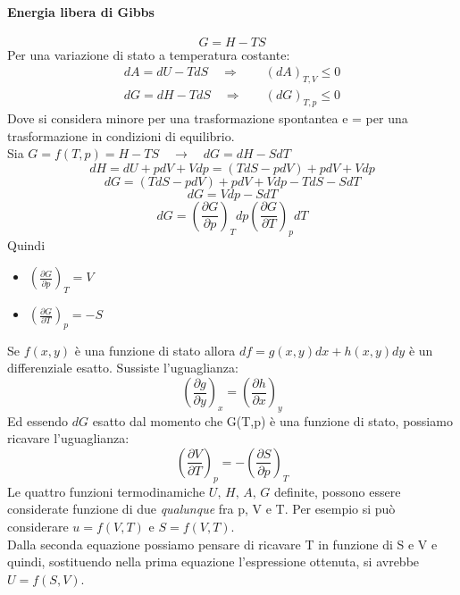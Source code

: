 \documentclass{article}
\newcommand{\so}{\quad \rightarrow \quad}
\newcommand{\So}{\quad \Rightarrow \quad}
\newcommand{\dpar}[3]{\left(\frac{\partial #1}{\partial #2}\right)_{#3}d#2}
\begin{document}
\paragraph{Energia libera di Gibbs}
\begin{equation*}
    G=H-TS
\end{equation*}
Per una variazione di stato a temperatura costante:
\begin{align*}
    dA=dU-TdS \So& (dA)_{T,V}\le0\\
    dG=dH-TdS \So& (dG)_{T,p}\le0
\end{align*}
Dove si considera minore per una trasformazione spontantea e = per una trasformazione in condizioni di equilibrio.\\
Sia $G=f(T,p)=H-TS \so dG=dH-SdT$
\begin{equation*}
    dH=dU+pdV+Vdp=(TdS-pdV)+pdV+Vdp 
\end{equation*}
\begin{equation*}
    dG=(TdS-pdV)+pdV+Vdp-TdS-SdT
\end{equation*}
\begin{equation*}
    dG=Vdp-SdT
\end{equation*}
\begin{equation*}
    dG=\dpar{G}{p}{T}\dpar{G}{T}{p}
\end{equation*}
Quindi
\begin{itemize}
    \item $(\frac{\partial G}{\partial p})_T=V$
    \item $(\frac{\partial G}{\partial T})_p=-S$
\end{itemize}
Se $f(x,y)$ è una funzione di stato allora $df=g(x,y)dx+h(x,y)dy$ è un differenziale esatto. Sussiste l'uguaglianza:
\begin{equation*}
    (\frac{\partial g}{\partial y})_x=(\frac{\partial h}{\partial x})_y
\end{equation*}
Ed essendo $dG$ esatto dal momento che G(T,p) è una funzione di stato, possiamo ricavare l'uguaglianza:
\begin{equation*}
    (\frac{\partial V}{\partial T})_p=-(\frac{\partial S}{\partial p})_T
\end{equation*}
Le quattro funzioni termodinamiche $U,\,H,\,A,\,G$ definite, possono essere considerate funzione di due \textit{qualunque} fra p, V e T. Per esempio si può considerare $u=f(V,T)$ e $S=f(V,T)$. \\
Dalla seconda equazione possiamo pensare di ricavare T in funzione di S e V e  quindi, sostituendo nella prima equazione l'espressione ottenuta, si avrebbe $U=f(S,V)$.\\
\end{document}
